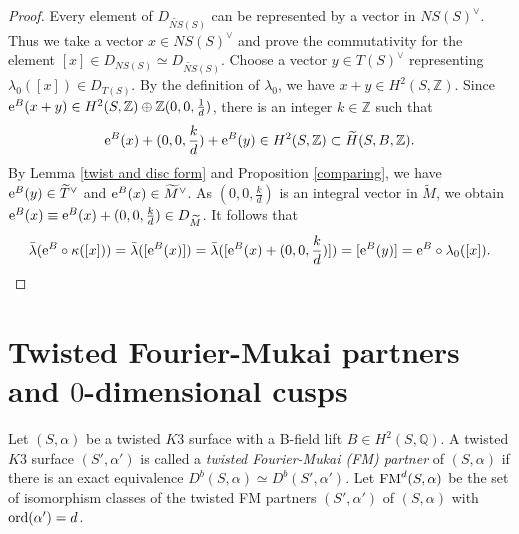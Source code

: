 \documentclass{article}
\theoremstyle{plain}
\theoremstyle{definition}
\theoremstyle{remark}
\newcommand{\Z}{{\mathbb Z}}
\newcommand{\Q}{{\mathbb Q}}
\begin{document}
\begin{proof}
Every element of 
$D_{\widetilde{NS}(S)}$ 
can be represented by a vector in 
$NS(S)^{\vee}$. 
Thus 
we take a vector $x \in NS(S)^{\vee}$ 
and prove the commutativity for the element 
$[x] \in D_{NS(S)} \simeq D_{\widetilde{NS}(S)}$. 
Choose a vector 
$y \in T(S)^{\vee}$ 
representing 
$\lambda _{0}([x]) \in D_{T(S)}$. 
By the definition of $\lambda _{0}$, 
we have 
$x+y \in H^{2}(S, {\Z})$. 
Since 
${\rm e\/}^{B}(x+y) \in H^{2}(S, {\Z}) \oplus {\Z}(0, 0, \frac{1}{d})$, 
there is an integer 
$k \in {\Z}$ 
such that 
\begin{equation*}
{\rm e\/}^{B}(x) + (0, 0, \frac{k}{d}) + {\rm e\/}^{B}(y) 
\in H^{2}(S, {\Z}) 
\subset \widetilde{H}(S, B, {\Z}). 
\end{equation*}
By Lemma \ref{twist and disc form} 
and Proposition \ref{comparing}, 
we have 
${\rm e\/}^{B}(y) \in \widetilde{T}^{\vee}$ 
and 
${\rm e\/}^{B}(x) \in \widetilde{M}^{\vee}$. 
As 
$(0, 0, \frac{k}{d})$ is an integral vector in $\widetilde{M}$, 
we obtain 
${\rm e\/}^{B}(x) \equiv {\rm e\/}^{B}(x) + (0, 0, \frac{k}{d}) \in D_{\widetilde{M}}$. 
It follows that 
\[
 \bar{\lambda}({\rm e\/}^{B} \circ \kappa ([x]))
= \bar{\lambda}([{\rm e\/}^{B}(x)]) 
= \bar{\lambda}([{\rm e\/}^{B}(x) + (0, 0, \frac{k}{d})]) 
= [{\rm e\/}^{B}(y)] 
= {\rm e\/}^{B} \circ \lambda _{0} ([x]). 
\]
\end{proof}  














\section{Twisted Fourier-Mukai partners and $0$-dimensional cusps}\label{sec3}



Let 
$(S, \alpha )$ 
be a twisted $K3$ surface 
with a B-field lift 
$B\in H^{2}(S, {\Q})$. 
A twisted $K3$ surface $(S', \alpha ')$ 
is called 
a {\it twisted Fourier-Mukai (FM) partner\/} of $(S, \alpha )$  
if there is an exact equivalence 
$D^{b}(S, \alpha ) \simeq D^{b}(S', \alpha ')$. 
Let 
${\rm FM\/}^{d}(S, \alpha )$ 
be the set of isomorphism classes of 
the twisted FM partners $(S', \alpha ')$ 
of $(S, \alpha )$ 
with ${\rm ord\/}(\alpha ')=d$. 
\end{document}
